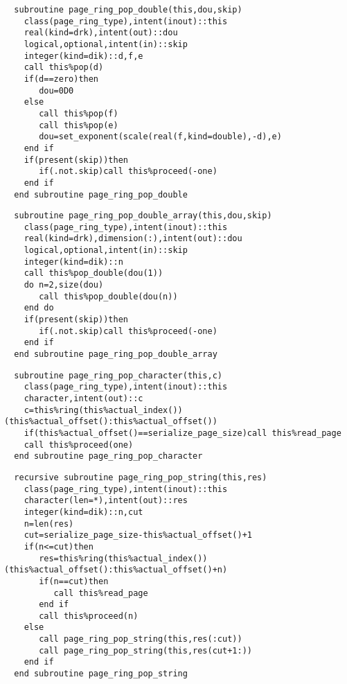 \begin{Verbatim}
  subroutine page_ring_pop_double(this,dou,skip)
    class(page_ring_type),intent(inout)::this
    real(kind=drk),intent(out)::dou
    logical,optional,intent(in)::skip
    integer(kind=dik)::d,f,e
    call this%pop(d)
    if(d==zero)then
       dou=0D0
    else
       call this%pop(f)
       call this%pop(e)
       dou=set_exponent(scale(real(f,kind=double),-d),e)
    end if
    if(present(skip))then
       if(.not.skip)call this%proceed(-one)
    end if
  end subroutine page_ring_pop_double
\end{Verbatim}

\begin{Verbatim}
  subroutine page_ring_pop_double_array(this,dou,skip)
    class(page_ring_type),intent(inout)::this
    real(kind=drk),dimension(:),intent(out)::dou
    logical,optional,intent(in)::skip
    integer(kind=dik)::n    
    call this%pop_double(dou(1))
    do n=2,size(dou)
       call this%pop_double(dou(n))
    end do
    if(present(skip))then
       if(.not.skip)call this%proceed(-one)
    end if
  end subroutine page_ring_pop_double_array
\end{Verbatim}

\begin{Verbatim}
  subroutine page_ring_pop_character(this,c)
    class(page_ring_type),intent(inout)::this
    character,intent(out)::c
    c=this%ring(this%actual_index())(this%actual_offset():this%actual_offset())
    if(this%actual_offset()==serialize_page_size)call this%read_page
    call this%proceed(one)
  end subroutine page_ring_pop_character
\end{Verbatim}

\begin{Verbatim}
  recursive subroutine page_ring_pop_string(this,res)
    class(page_ring_type),intent(inout)::this
    character(len=*),intent(out)::res
    integer(kind=dik)::n,cut
    n=len(res)
    cut=serialize_page_size-this%actual_offset()+1
    if(n<=cut)then
       res=this%ring(this%actual_index())(this%actual_offset():this%actual_offset()+n)
       if(n==cut)then
          call this%read_page
       end if
       call this%proceed(n)
    else
       call page_ring_pop_string(this,res(:cut))
       call page_ring_pop_string(this,res(cut+1:))
    end if
  end subroutine page_ring_pop_string
\end{Verbatim}

